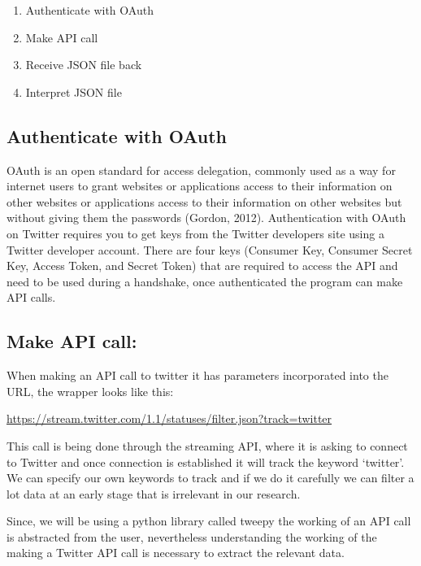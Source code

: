 \begin{enumerate}
  \item Authenticate with OAuth
  \item Make API call
  \item Receive JSON file back
  \item Interpret JSON file
\end{enumerate}

\subsection{Authenticate with OAuth}

OAuth is an open standard for access delegation, commonly used as a way for internet users to grant websites or applications access to their information on other websites or applications access to their information on other websites but without giving them the passwords (Gordon, 2012). Authentication with OAuth on Twitter requires you to get keys from the Twitter developers site using a Twitter developer account. There are four keys (Consumer Key, Consumer Secret Key, Access Token, and Secret Token) that are required to access the API and need to be used during a handshake, once authenticated the program can make API calls.

%

\subsection{Make API call:}

When making an API call to twitter it has parameters incorporated into the URL, the wrapper looks like this:

\url{https://stream.twitter.com/1.1/statuses/filter.json?track=twitter}

This call is being done through the streaming API, where it is asking to connect to Twitter and once connection is established it will track the keyword ‘twitter’. We can specify our own keywords to track and if we do it carefully we can filter a lot data at an early stage that is irrelevant in our research.

Since, we will be using a python library called tweepy the working of an API call is abstracted from the user, nevertheless understanding the working of the making a Twitter API call is necessary to extract the relevant data.

